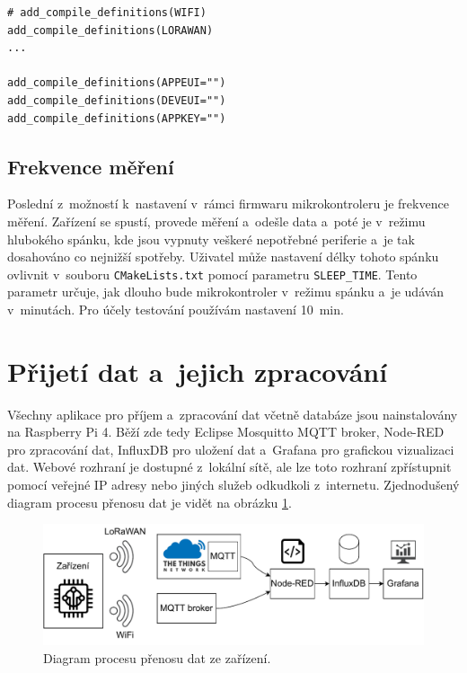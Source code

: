 \begin{lstlisting}[caption={Nastavení spojení pomocí LoRaWAN}]
# add_compile_definitions(WIFI)
add_compile_definitions(LORAWAN)
...

add_compile_definitions(APPEUI="")
add_compile_definitions(DEVEUI="")
add_compile_definitions(APPKEY="")
\end{lstlisting}

\subsection{Frekvence měření}

Poslední z~možností k~nastavení v~rámci firmwaru mikrokontroleru je frekvence měření. Zařízení se spustí, provede měření a~odešle data a~poté je v~režimu hlubokého spánku, kde jsou vypnuty veškeré nepotřebné periferie a~je tak dosahováno co nejnižší spotřeby. Uživatel může nastavení délky tohoto spánku ovlivnit v~souboru \texttt{CMakeLists.txt} pomocí parametru \texttt{SLEEP_TIME}. Tento parametr určuje, jak dlouho bude mikrokontroler v~režimu spánku a~je udáván v~minutách. Pro účely testování používám nastavení \SI{10}{\minute}.

\section{Přijetí dat a~jejich zpracování}

Všechny aplikace pro příjem a~zpracování dat včetně databáze jsou nainstalovány na Raspberry Pi 4. Běží zde tedy Eclipse Mosquitto MQTT broker, Node-RED pro zpracování dat, InfluxDB pro uložení dat a~Grafana pro grafickou vizualizaci dat. Webové rozhraní je dostupné z~lokální sítě, ale lze toto rozhraní zpřístupnit pomocí veřejné IP adresy nebo jiných služeb odkudkoli z~internetu. Zjednodušený diagram procesu přenosu dat je vidět na obrázku \ref{fig_dataFlow}.

\begin{figure}[h]
    \centering
    \includegraphics[width=\textwidth]{obrazky/data_flow.pdf}
    \caption{Diagram procesu přenosu dat ze zařízení.}
    \label{fig_dataFlow}
\end{figure}

